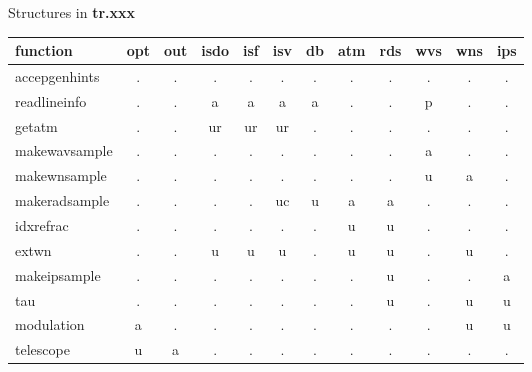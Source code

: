 \documentclass{article}
\begin{document}
\vspace{1cm}

\begin{center}
{\large Structures in {\bf tr.xxx}}\\[1cm]
\begin{tabular}{l|ccccccccccc}
function
   & opt & out & isdo & isf & isv & db & atm & rds & wvs & wns & ips \\
\hline
accepgenhints
   &  .  & .   & .    & .   & .   & .  & .   & .   & .   & .   & .   \\
readlineinfo
   &  .  & .   & a    & a   & a   & a  & .   & .   & p   & .   & .   \\
getatm
   &  .  & .   & ur   & ur  & ur  & .  & .   & .   & .   & .   & .   \\
makewavsample
   &  .  & .   & .    & .   & .   & .  & .   & .   & a   & .   & .   \\
makewnsample
   &  .  & .   & .    & .   & .   & .  & .   & .   & u   & a   & .   \\
makeradsample
   &  .  & .   & .    & .   & uc  & u  & a   & a   & .   & .   & .   \\
idxrefrac
   &  .  & .   & .    & .   & .   & .  & u   & u   & .   & .   & .   \\
extwn
   &  .  & .   & u    & u   & u   & .  & u   & u   & .   & u   & .   \\
makeipsample
   &  .  & .   & .    & .   & .   & .  & .   & u   & .   & .   & a   \\
tau
   &  .  & .   & .    & .   & .   & .  & .   & u   & .   & u   & u   \\
modulation
   &  a  & .   & .    & .   & .   & .  & .   & .   & .   & u   & u   \\
telescope
   &  u  & a   & .    & .   & .   & .  & .   & .   & .   & .   & .   \\
\hline
\end{tabular}
\end{center}
\end{document}
